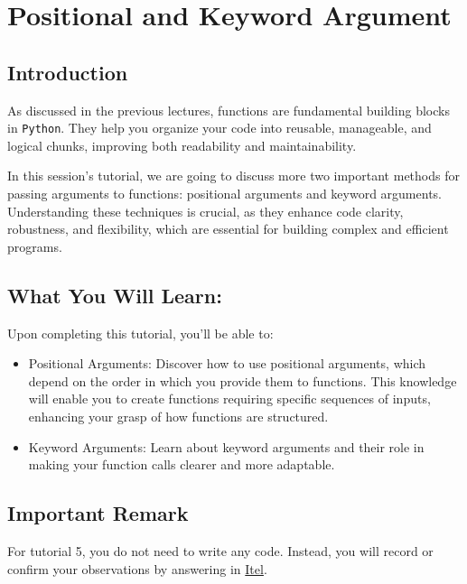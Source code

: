 

\section{Positional and Keyword Argument}

\subsection{Introduction}
As discussed in the previous lectures, functions are fundamental building blocks in \texttt{Python}. They help you organize your code into reusable, manageable, and logical chunks, improving both readability and maintainability.

In this session's tutorial, we are going to discuss  more two important methods for passing arguments to functions: positional arguments and keyword arguments. Understanding these techniques is crucial, as they enhance code clarity, robustness, and flexibility, which are essential for building complex and efficient programs.



\subsection{What You Will Learn:}

Upon completing this tutorial, you'll be able to:
\begin{itemize}\setlength{\itemsep}{0pt}
    \item Positional Arguments: Discover how to use positional arguments, which depend on the order in which you provide them to functions. This knowledge will enable you to create functions requiring specific sequences of inputs, enhancing your grasp of how functions are structured.
    \item Keyword Arguments: Learn about keyword arguments and their role in making your function calls clearer and more adaptable.
\end{itemize}

\subsection{Important Remark}

For tutorial 5, you do not need to write any code. Instead, you will record or confirm your observations by answering in \href{https://itel.ums.edu.my/mod/quiz/view.php?id=1013117}{Itel}.

